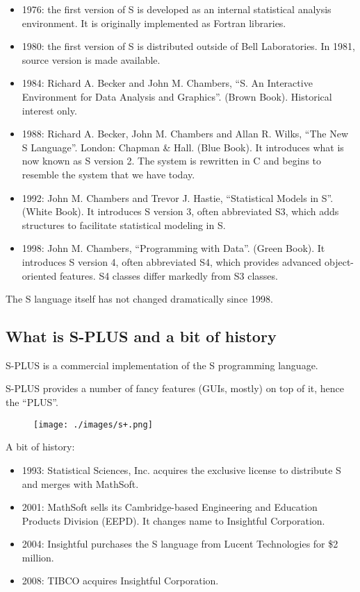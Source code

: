 \documentclass[]{book}
\providecommand{\tightlist}{%
  \setlength{\itemsep}{0pt}\setlength{\parskip}{0pt}}
\def\tightlist{}
\begin{document}
\begin{itemize}
\tightlist
\item
  1976: the first version of S is developed as an internal statistical
  analysis environment. It is originally implemented as Fortran
  libraries.
\item
  1980: the first version of S is distributed outside of Bell
  Laboratories. In 1981, source version is made available.
\item
  1984: Richard A. Becker and John M. Chambers, ``S. An Interactive
  Environment for Data Analysis and Graphics''. (Brown Book). Historical
  interest only.
\item
  1988: Richard A. Becker, John M. Chambers and Allan R. Wilks, ``The
  New S Language''. London: Chapman \& Hall. (Blue Book). It introduces
  what is now known as S version 2. The system is rewritten in C and
  begins to resemble the system that we have today.
\item
  1992: John M. Chambers and Trevor J. Hastie, ``Statistical Models in
  S''. (White Book). It introduces S version 3, often abbreviated S3,
  which adds structures to facilitate statistical modeling in S.
\item
  1998: John M. Chambers, ``Programming with Data''. (Green Book). It
  introduces S version 4, often abbreviated S4, which provides advanced
  object-oriented features. S4 classes differ markedly from S3 classes.
\end{itemize}

The S language itself has not changed dramatically since 1998.

\subsection{What is S-PLUS and a bit of
history}\label{what-is-s-plus-and-a-bit-of-history}

S-PLUS is a commercial implementation of the S programming language.

S-PLUS provides a number of fancy features (GUIs, mostly) on top of it,
hence the ``PLUS''.

\begin{figure}[htbp]
\centering
\texttt{[image: ./images/s+.png]}
\caption{}
\end{figure}

A bit of history:

\begin{itemize}
\tightlist
\item
  1993: Statistical Sciences, Inc. acquires the exclusive license to
  distribute S and merges with MathSoft.
\item
  2001: MathSoft sells its Cambridge-based Engineering and Education
  Products Division (EEPD). It changes name to Insightful Corporation.
\item
  2004: Insightful purchases the S language from Lucent Technologies for
  \$2 million.
\item
  2008: TIBCO acquires Insightful Corporation.
\end{itemize}
\end{document}
